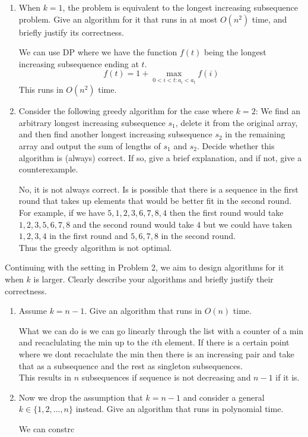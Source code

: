 \documentclass[answers,12pt,addpoints]{exam}
\begin{document}
\begin{questions}
\begin{enumerate}
    \item When $k = 1$, the problem is equivalent to the longest increasing subsequence problem. Give an algorithm for it that runs in at most $O(n^2)$ time, and briefly justify its correctness.
    \begin{solution}
        We can use DP where we have the function $f(t)$ being the longest increasing subsequence ending at $t$.
        $$ f(t)  = 1 + \max_{0 < i < t: a_i < a_t} f(i)$$
        This runs in $O(n^2)$ time.
    \end{solution}
    \item Consider the following greedy algorithm for the case where $k = 2$: We find an arbitrary longest increasing subsequence $s_1$, delete it from the original array, and then find another longest increasing subsequence $s_2$ in the remaining array and output the sum of lengths of $s_1$ and $s_2$. Decide whether this algorithm is (always) correct. If so, give a brief explanation, and if not, give a counterexample.
    \begin{solution}
        No, it is not always correct. Is is possible that there is a sequence in the first round that takes up elements that would be better fit in the second round. For example, if we have $5, 1, 2, 3, 6, 7, 8, 4$ then the first round would take $ 1, 2, 3, 5, 6, 7, 8$ and the second round would take $4$ but we could have taken $1, 2, 3, 4$ in the first round and $5, 6, 7, 8$ in the second round.\\
        Thus the greedy algorithm is not optimal.
    \end{solution}
\end{enumerate}
Continuing with the setting in Problem 2, we aim to design algorithms for it
when $k$ is larger. Clearly describe your algorithms and briefly justify their
correctness. 
\begin{enumerate}
    \item Assume $k = n - 1$. Give an algorithm that runs in $O(n)$ time.
    \begin{solution}
        What we can do is we can go linearly through the list with a counter of a min and recaclulating the min up to the $i$th element. If there is a certain point where we dont recaclulate the min then there is an increasing pair and take that as a subsequence and the rest as singleton subsequences.\\
        This results in $n$ subsequences if sequence is not decreasing and $n-1$ if it is.\\
    \end{solution}
    \item Now we drop the assumption that $k = n - 1$ and consider a general $k \in \{1, 2, \dots, n\}$ instead. Give an algorithm that runs in polynomial time.
    \begin{solution}
        We can constrc
    \end{solution}
\end{enumerate}



\end{questions}
\end{document}

